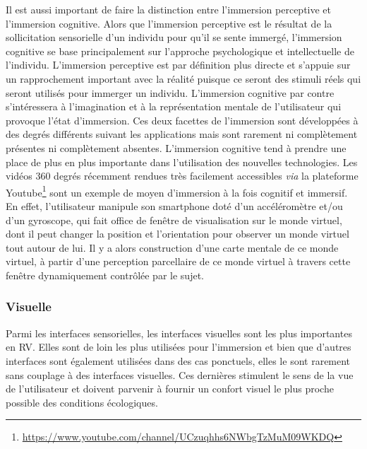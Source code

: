 Il est aussi important de faire la distinction entre l'immersion perceptive et l'immersion cognitive. Alors que l'immersion perceptive est le résultat de la sollicitation sensorielle d'un individu pour qu'il se sente immergé, l'immersion cognitive se base principalement sur l'approche psychologique et intellectuelle de l'individu. L'immersion perceptive est par définition plus directe et s'appuie sur un rapprochement important avec la réalité puisque ce seront des stimuli réels qui seront utilisés pour immerger un individu. L'immersion cognitive par contre s'intéressera à l'imagination et à la représentation mentale de l'utilisateur qui provoque l'état d'immersion. Ces deux facettes de l'immersion sont développées à des degrés différents suivant les applications mais sont rarement ni complètement présentes ni complètement absentes. L'immersion cognitive tend à prendre une place de plus en plus importante dans l'utilisation des nouvelles technologies. Les vidéos 360 degrés récemment rendues très facilement accessibles \textit{via} la plateforme Youtube\footnote{\url{https://www.youtube.com/channel/UCzuqhhs6NWbgTzMuM09WKDQ}} sont un exemple de moyen d'immersion à la fois cognitif et immersif. En effet, l'utilisateur  manipule son smartphone doté d'un accéléromètre et/ou d'un gyroscope, qui fait office de fenêtre de visualisation sur le monde virtuel, dont il peut changer la position et l'orientation pour observer un monde virtuel tout autour de lui. Il y a alors construction d'une carte mentale de ce monde virtuel, à partir d'une perception parcellaire de ce monde virtuel à travers cette fenêtre dynamiquement contrôlée par le sujet.

\subsubsection{Visuelle}\label{immersion_visuelle}

Parmi les interfaces sensorielles, les interfaces visuelles sont les plus importantes en RV. Elles sont de loin les plus utilisées pour l'immersion et bien que d'autres interfaces sont également utilisées dans des cas ponctuels, elles le sont rarement sans couplage à des interfaces visuelles. Ces dernières stimulent le sens de la vue de l'utilisateur et doivent parvenir à fournir un confort visuel le plus proche possible des conditions écologiques.

 \label{stereo_3d}

